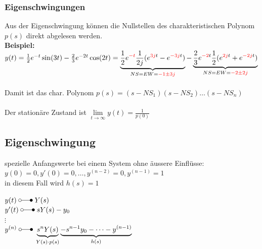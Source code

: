 		\subsubsection{Eigenschwingungen}
			Aus der Eigenschwingung können die Nullstellen des charakteristischen Polynom $p(s)$ 
			direkt abgelesen werden. \\
			\textbf{Beispiel:} \\
			$y(t) = \frac{1}{2} e^{-t} \sin(3t) - \frac{2}{3} e^{-2t} \cos(2t) = 
			\underbrace{\frac{1}{2} e^{\textcolor{red}{-t}} \frac{1}{2j}(e^{\textcolor{red}{3j}t}
			-e^{\textcolor{red}{-3j}t})}_{NS = EW = \textcolor{red}{-1 \pm 3j}} - 
			\underbrace{\frac{2}{3} e^{\textcolor{red}{-2}t} \frac{1}{2}(e^{\textcolor{red}{2j}t}
			+e^{\textcolor{red}{-2j}t})}_{NS = EW = \textcolor{red}{-2 \pm 2j}}$ \\\\
			Damit ist das char. Polynom $p(s) = (s-NS_1)(s-NS_2)\ldots(s-NS_n)$ \\\\
			Der stationäre Zustand ist $\lim\limits_{t\rightarrow\infty}y(t) = \frac{1}{p(0)}$ \\
				
		
	\subsection{Eigenschwingung}
		\begin{minipage}{12cm}
			spezielle Anfangswerte bei einem System ohne äussere Einflüsse:\\
			$y(0) = 0, y'(0) = 0, \dots , y^{(n-2)} = 0, y^{(n-1)} = 1$\\
			in diesem Fall wird $h(s) = 1$\\
		\end{minipage}
		\begin{minipage}{6cm}
			$y(t) \; \laplace \; Y(s)$\\
			$y'(t) \; \laplace \; sY(s) - y_0$\\
			$\vdots$\\
			$y^{(n)} \; \laplace \; 
			\underbrace{s^nY(s)}_{Y(s) \cdot p(s)}
			\underbrace{-s^{n-1}y_0 - \dots - y^{(n-1)}}_{h(s)}$
		\end{minipage}